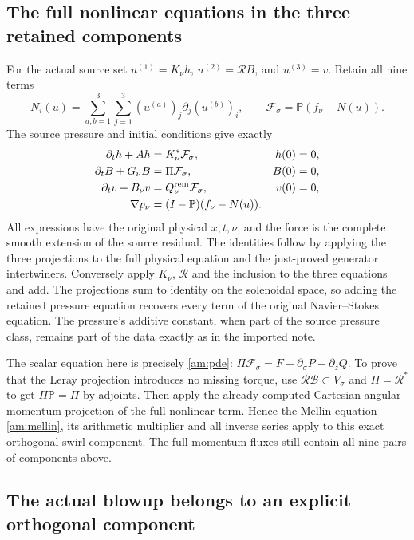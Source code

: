 \subsection*{The full nonlinear equations in the three retained components}

For the actual source set $u^{(1)}=K_\nu h$,
$u^{(2)}=\mathcal RB$, and $u^{(3)}=v$. Retain all nine terms
\[
 N_i(u)=\sum_{a,b=1}^3\sum_{j=1}^3
                 (u^{(a)})_j\partial_j(u^{(b)})_i,
 \qquad \mathcal F_\sigma=\mathbb P(f_\nu-N(u)).
\]
The source pressure and initial conditions give exactly
\begin{align*}
 \partial_t h+Ah&=K_\nu^*\mathcal F_\sigma,&h(0)&=0,\\
 \partial_t B+G_\nu B&=\Pi\mathcal F_\sigma,&B(0)&=0,\\
 \partial_t v+B_\nu v&=Q_\nu^{\rm rem}\mathcal F_\sigma,&v(0)&=0,\\
 \nabla p_\nu&=(I-\mathbb P)(f_\nu-N(u)).
\end{align*}
All expressions have the original physical $x,t,\nu$, and the force
is the complete smooth extension of the source residual.
The identities follow by applying the three projections to the full
physical equation and the just-proved generator intertwiners.
Conversely apply $K_\nu$, $\mathcal R$ and the inclusion to the
three equations and add. The projections sum to identity on the
solenoidal space, so adding the retained pressure equation recovers
every term of the original Navier--Stokes equation. The pressure's
additive constant, when part of the source pressure class, remains
part of the data exactly as in the imported note.

The scalar equation here is precisely \eqref{am:pde}:
$\Pi\mathcal F_\sigma=F-\partial_\sigma P-\partial_zQ$.
To prove that the Leray projection introduces no missing torque,
use $\mathcal R\mathcal B\subset V_\sigma$ and
$\Pi=\mathcal R^*$ to get $\Pi\mathbb P=\Pi$ by adjoints.
Then apply the already computed Cartesian angular-momentum
projection of the full nonlinear term. Hence the Mellin equation
\eqref{am:mellin}, its arithmetic multiplier and all inverse series
apply to this exact orthogonal swirl component. The full momentum
fluxes still contain all nine pairs of components above.

\subsection*{The actual blowup belongs to an explicit orthogonal component}

